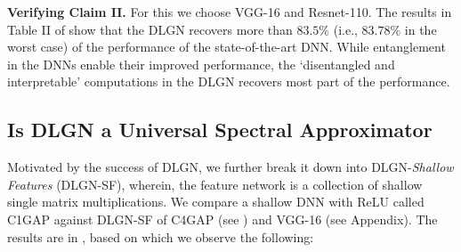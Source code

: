 


\textbf{Verifying Claim II.} For this we choose VGG-16 and Resnet-110. The results in Table II of  show that the DLGN recovers more than $83.5\%$ (i.e., $83.78\%$ in the worst case) of the performance of the state-of-the-art DNN. %
While entanglement in the DNNs enable their improved performance,  the `disentangled and interpretable'  computations in the DLGN recovers most part of the performance. %

\subsection{Is DLGN a Universal Spectral Approximator}
Motivated by the success of DLGN, we further break it down into DLGN-\emph{Shallow Features} (DLGN-SF), wherein, the feature network is a collection of shallow single matrix multiplications. We compare a shallow DNN with ReLU called C1GAP against DLGN-SF of C4GAP (see ) and VGG-16 (see Appendix). The results are in , based on which we observe the following:

